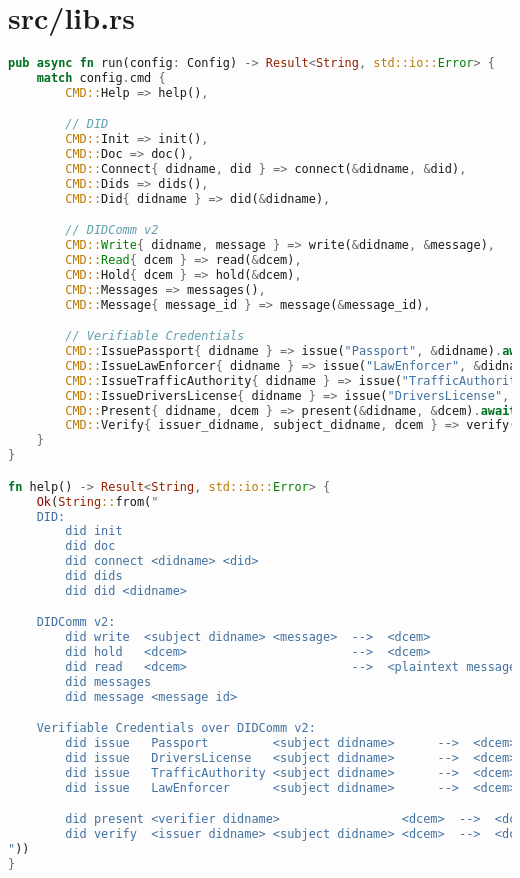 \section{src/lib.rs}
\begin{lstlisting}[language=Rust]
pub async fn run(config: Config) -> Result<String, std::io::Error> {
    match config.cmd {
        CMD::Help => help(),

        // DID
        CMD::Init => init(),
        CMD::Doc => doc(),
        CMD::Connect{ didname, did } => connect(&didname, &did),
        CMD::Dids => dids(),
        CMD::Did{ didname } => did(&didname),

        // DIDComm v2
        CMD::Write{ didname, message } => write(&didname, &message),
        CMD::Read{ dcem } => read(&dcem),
        CMD::Hold{ dcem } => hold(&dcem),
        CMD::Messages => messages(),
        CMD::Message{ message_id } => message(&message_id),

        // Verifiable Credentials
        CMD::IssuePassport{ didname } => issue("Passport", &didname).await,
        CMD::IssueLawEnforcer{ didname } => issue("LawEnforcer", &didname).await,
        CMD::IssueTrafficAuthority{ didname } => issue("TrafficAuthority", &didname).await,
        CMD::IssueDriversLicense{ didname } => issue("DriversLicense", &didname).await,
        CMD::Present{ didname, dcem } => present(&didname, &dcem).await,
        CMD::Verify{ issuer_didname, subject_didname, dcem } => verify(&issuer_didname, &subject_didname, &dcem).await,
    }
}

fn help() -> Result<String, std::io::Error> {
    Ok(String::from("
    DID:
        did init
        did doc
        did connect <didname> <did>
        did dids
        did did <didname>

    DIDComm v2:
        did write  <subject didname> <message>  -->  <dcem>
        did hold   <dcem>                       -->  <dcem>
        did read   <dcem>                       -->  <plaintext message>
        did messages
        did message <message id>

    Verifiable Credentials over DIDComm v2:
        did issue   Passport         <subject didname>      -->  <dcem>
        did issue   DriversLicense   <subject didname>      -->  <dcem>
        did issue   TrafficAuthority <subject didname>      -->  <dcem>
        did issue   LawEnforcer      <subject didname>      -->  <dcem>

        did present <verifier didname>                 <dcem>  -->  <dcem>
        did verify  <issuer didname> <subject didname> <dcem>  -->  <dcem>
"))
}


\end{lstlisting}
